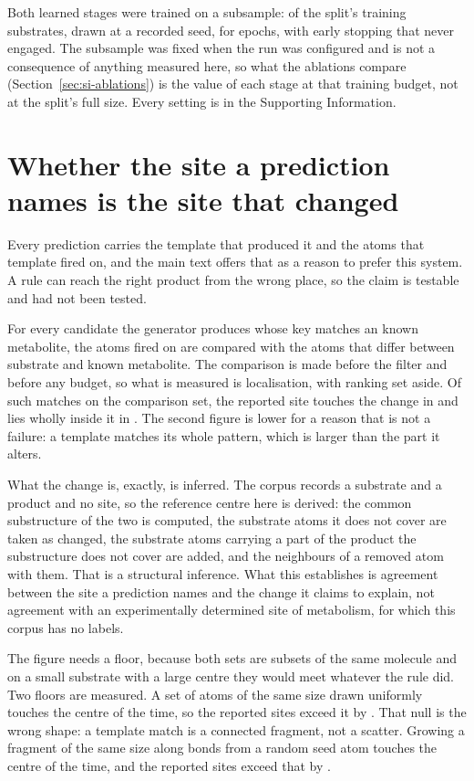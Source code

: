 \documentclass[journal=jcisd8,manuscript=suppinfo,layout=onecolumn]{achemso}
\begin{document}
Both learned stages were trained on a subsample: \numTrainSubstrates{} of the split's
\numSplitTrainSubstrates{} training substrates, drawn at a recorded seed, for
\numTrainEpochsWord{} epochs, with early stopping that never engaged. The subsample was fixed when
the run was configured and is not a consequence of anything measured here, so what the ablations
compare (Section~\ref{sec:si-ablations}) is the value of each stage at that training budget,
not at the split's full size. Every setting is in the Supporting Information.
\section{Whether the site a prediction names is the site that changed}
\label{sec:si-site}

Every prediction carries the template that produced it and the atoms that template fired on, and
the main text offers that as a reason to prefer this system. A rule can reach the right product
from the wrong place, so the claim is testable and had not been tested.

For every candidate the generator produces whose key matches an known metabolite, the atoms
fired on are compared with the atoms that differ between substrate and known metabolite. The comparison
is made before the filter and before any budget, so what is measured is localisation, with ranking
set aside. Of \numSiteScored{} such matches on the comparison set, the reported site touches the
change in \numSiteTouchingPct{} and lies wholly inside it in \numSiteInsidePct{}. The second
figure is lower for a reason that is not a failure: a template matches its whole pattern, which
is larger than the part it alters.

What the change is, exactly, is inferred. The corpus records a substrate and a
product and no site, so the reference centre here is derived: the common substructure of the two
is computed, the substrate atoms it does not cover are taken as changed, the substrate atoms
carrying a part of the product the substructure does not cover are added, and the neighbours of a
removed atom with them. That is a structural inference. What this establishes is agreement between
the site a prediction names and the change it claims to explain, not agreement with an
experimentally determined site of metabolism, for which this corpus has no labels.

The figure needs a floor, because both sets are subsets of the same molecule and on a small
substrate with a large centre they would meet whatever the rule did. Two floors are measured. A
set of atoms of the same size drawn uniformly touches the centre \numSiteNullPct{} of the time, so
the reported sites exceed it by \numSiteMarginPct{}. That null is the wrong shape: a template match
is a connected fragment, not a scatter. Growing a fragment of the same size along bonds from a
random seed atom touches the centre \numSiteConnectednullPct{} of the time, and the reported sites
exceed that by \numSiteConnectedmarginPct{}.
\end{document}
